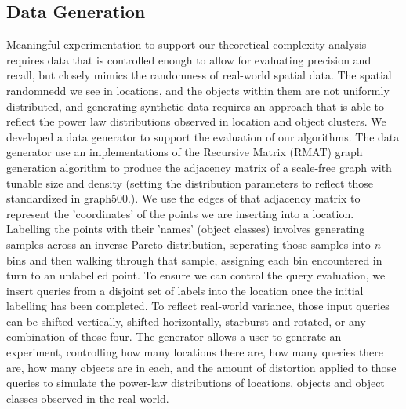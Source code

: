 \subsection{Data Generation}
\par{Meaningful experimentation to support our theoretical complexity analysis requires data that is controlled enough to allow for evaluating precision and recall, but closely mimics the randomness of real-world spatial data.
The spatial randomnedd we see in locations, and the objects within them are not uniformly distributed, and generating synthetic data requires an approach that is able to reflect the power law distributions observed in location and object clusters.  
We developed a data generator to support the evaluation of our algorithms. 
The data generator use an implementations of the Recursive Matrix (RMAT) graph generation algorithm \cite{Chakrabarti2004} to produce the adjacency matrix of a scale-free graph with tunable size and density (setting the distribution parameters to reflect those standardized in graph500.).
We use the edges of that adjacency matrix to represent the 'coordinates' of the points we are inserting into a location. 
Labelling the points with their 'names' (object classes) involves generating samples across an inverse Pareto distribution, seperating those samples into \textit{n} bins and then walking through that sample, assigning each bin encountered in turn to an unlabelled point.
To ensure we can control the query evaluation, we insert queries from a disjoint set of labels into the location once the initial labelling has been completed. 
To reflect real-world variance, those input queries can be shifted vertically, shifted horizontally, starburst and rotated, or any combination of those four.
The generator allows a user to generate an experiment, controlling how many locations there are, how many queries there are, how many objects are in each, and the amount of distortion applied to those queries to simulate the power-law distributions of locations, objects and object classes observed in the real world.}